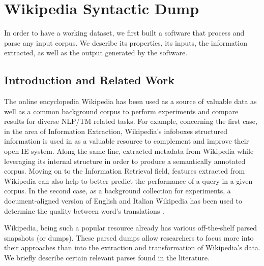 

\chapter{Wikipedia Syntactic Dump}
In order to have a working dataset, we first built a software that process and parse any input corpus. We describe its properties, its inputs, the information extracted, as well as the output generated by the software.



\section{Introduction and Related Work}

The online encyclopedia Wikipedia has been used as a source of valuable data as well as a common background corpus to perform experiments and compare results for diverse NLP/TM related tasks. For example, concerning the first case, in the area of Information Extraction, Wikipedia's infoboxes structured information is used in \cite{Wu2010} as a valuable resource to complement and improve their open IE system. Along the same line, \cite{charton2010}  extracted metadata from Wikipedia while leveraging its internal structure in order to produce a semantically annotated corpus. Moving on to the Information Retrieval field, features extracted from Wikipedia can also help to better predict the performance of a query  \cite{katz2014} in a given  corpus.  In the second case, as a background collection for experiments, a document-aligned version of English and Italian Wikipedia has been used to determine the quality between word's translations \cite{vulic2011}.  

Wikipedia, being such a popular resource  already has various off-the-shelf parsed snapshots (or dumps). These parsed dumps allow researchers to focus more into their approaches than into the extraction and transformation of Wikipedia's data.  We briefly describe certain relevant parses found in the literature.   
%



